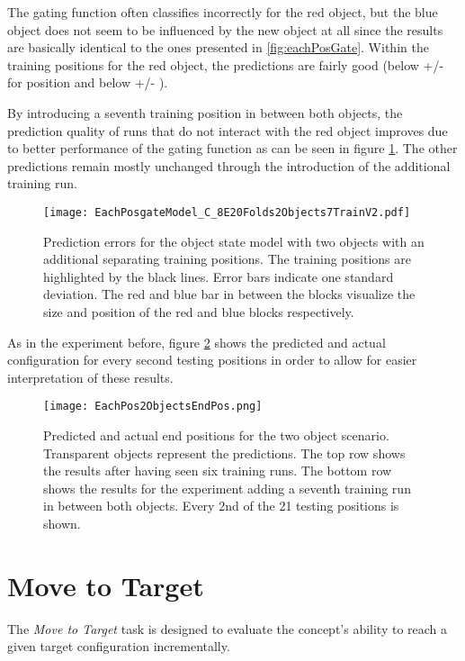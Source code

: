 The gating function often classifies incorrectly for the red object, but the blue object does not seem to be influenced by the new object at all since the results are basically identical to the ones presented in \ref{fig:eachPosGate}. 
Within the training positions for the red object, the predictions are fairly good (below  +/-  for position and below  +/- ).

By introducing a seventh training position in between both objects, the prediction quality of runs that do not interact with the red object improves due to better performance of the gating function as can be seen in figure \ref{fig:eachPosTwoObjects7Trains}. The other predictions remain mostly unchanged through the introduction of the additional training run.

\begin{figure}
\centering
\texttt{[image: EachPosgateModel\_C\_8E20Folds2Objects7TrainV2.pdf]}
\caption{Prediction errors for the object state model with two objects with an additional separating training positions. The training positions are highlighted by the black lines. Error bars indicate one standard deviation. The red and blue bar in between the blocks visualize the size and position of the red and blue blocks respectively.}
\label{fig:eachPosTwoObjects7Trains}
\end{figure}

As in the experiment before, figure \ref{fig:eachPosTwoObjectsEndPos} shows the predicted and actual configuration for every second testing positions in order to allow for easier interpretation of these results.

\begin{figure}
\centering
\texttt{[image: EachPos2ObjectsEndPos.png]}
\caption{Predicted and actual end positions for the two object scenario. Transparent objects represent the predictions. The top row shows the results after having seen six training runs. The bottom row shows the results for the experiment adding a seventh training run in between both objects. Every 2nd of the 21 testing positions is shown.}
\label{fig:eachPosTwoObjectsEndPos}
\end{figure}


\section{Move to Target \label{sec:moveToTarget}}

The \textit{Move to Target} task is designed to evaluate the concept's ability to reach a given target configuration incrementally. 

